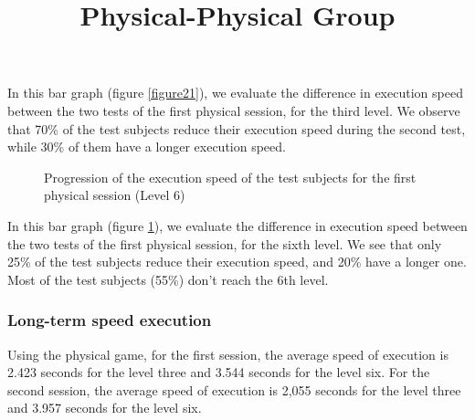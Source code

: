 \documentclass[12pt, openany, twocolumn]{article}
\begin{document}
            In this bar graph (figure \ref{figure21}), we evaluate the difference in execution speed between the two tests of the first physical session, for the third level.
            We observe that 70\% of the test subjects reduce their execution speed during the second test, while 30\% of them have a longer execution speed.

                \begin{figure}[H]
                    \centering
                    \setlength{\fboxsep}{0pt}
                    \caption{Progression of the execution speed of the test subjects for the first physical session (Level 6)}
                    \label{figure22}
                \end{figure}

            In this bar graph (figure \ref{figure22}), we evaluate the difference in execution speed between the two tests of the first physical session, for the sixth level.
            We see that only 25\% of the test subjects reduce their execution speed, and 20\% have a longer one. Most of the test subjects (55\%) don't reach the 6th level.

    \subsubsection{Long-term speed execution}

    \noindent \title{\textbf{Physical-Physical Group}} \vspace{0.25cm}

    Using the physical game, for the first session, the average speed of execution is 2.423 seconds for the level three and 3.544 seconds for the level six. For the second session, the average speed of execution is  2,055 seconds for the level three and 3.957 seconds for the level six.
    \\
\end{document}
